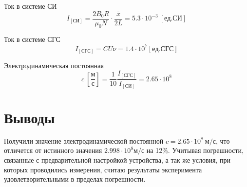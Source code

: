 \documentclass{article}
\begin{document}
Ток в системе СИ
\begin{equation*}
    I_{[СИ]} = \frac{2 B_0 R}{\mu_0 N} \cdot \frac{\bar{x}}{2L} = 5.3 \cdot 10^{-3}\ [ед. СИ]
\end{equation*}

Ток в системе СГС
\begin{equation*}
    I_{[СГС]} = CU\nu = 1.4 \cdot 10^7 [ед. СГС]
\end{equation*}

Электродинамическая постоянная
\begin{equation*}
    c\ \left[\frac{м}{с}\right] = \frac{1}{10} \frac{I_{[СГС]}}{I_{[СИ]}}=2.65\cdot10^8
\end{equation*}

\section{Выводы}
Получили значение электродинамической постоянной $c=2.65 \cdot 10^8\ м/с$, что отличется
от истинного значения $2.998 \cdot 10^8 м/с$ на 12\%. Учитывая погрешности, связанные с
предварительной настройкой устройства, а так же условия, при которых проводились
измерения, считаю результаты эксперимента удовлетворительными в пределах погрешности.
\end{document}
